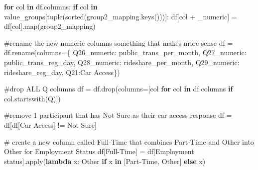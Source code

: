 \documentclass[
  letterpaper,
  DIV=11,
  numbers=noendperiod]{scrartcl}
\newenvironment{Shaded}{\begin{snugshade}}{\end{snugshade}}
\newcommand{\BuiltInTok}[1]{\textcolor[rgb]{0.00,0.23,0.31}{#1}}
\newcommand{\CommentTok}[1]{\textcolor[rgb]{0.37,0.37,0.37}{#1}}
\newcommand{\ControlFlowTok}[1]{\textcolor[rgb]{0.00,0.23,0.31}{\textbf{#1}}}
\newcommand{\KeywordTok}[1]{\textcolor[rgb]{0.00,0.23,0.31}{\textbf{#1}}}
\newcommand{\NormalTok}[1]{\textcolor[rgb]{0.00,0.23,0.31}{#1}}
\newcommand{\OperatorTok}[1]{\textcolor[rgb]{0.37,0.37,0.37}{#1}}
\newcommand{\StringTok}[1]{\textcolor[rgb]{0.13,0.47,0.30}{#1}}
\begin{document}
\begin{Shaded}
\begin{Highlighting}[]
\ControlFlowTok{for}\NormalTok{ col }\KeywordTok{in}\NormalTok{ df.columns:}
    \ControlFlowTok{if}\NormalTok{ col }\KeywordTok{in}\NormalTok{ value\_groups[}\BuiltInTok{tuple}\NormalTok{(}\BuiltInTok{sorted}\NormalTok{(group2\_mapping.keys()))]:}
\NormalTok{        df[col }\OperatorTok{+} \StringTok{\textquotesingle{}\_numeric\textquotesingle{}}\NormalTok{] }\OperatorTok{=}\NormalTok{ df[col].}\BuiltInTok{map}\NormalTok{(group2\_mapping)}

\CommentTok{\#rename the new numeric columns something that makes more sense}
\NormalTok{df }\OperatorTok{=}\NormalTok{ df.rename(columns}\OperatorTok{=}\NormalTok{\{}
  \StringTok{\textquotesingle{}Q26\_numeric\textquotesingle{}}\NormalTok{: }\StringTok{\textquotesingle{}public\_trans\_per\_month\textquotesingle{}}\NormalTok{, }
  \StringTok{\textquotesingle{}Q27\_numeric\textquotesingle{}}\NormalTok{: }\StringTok{\textquotesingle{}public\_trans\_reg\_day\textquotesingle{}}\NormalTok{, }
  \StringTok{\textquotesingle{}Q28\_numeric\textquotesingle{}}\NormalTok{: }\StringTok{\textquotesingle{}rideshare\_per\_month\textquotesingle{}}\NormalTok{, }
  \StringTok{\textquotesingle{}Q29\_numeric\textquotesingle{}}\NormalTok{: }\StringTok{\textquotesingle{}rideshare\_reg\_day\textquotesingle{}}\NormalTok{, }
  \StringTok{\textquotesingle{}Q21\textquotesingle{}}\NormalTok{:}\StringTok{\textquotesingle{}Car Access\textquotesingle{}}\NormalTok{\})}


\CommentTok{\#drop ALL Q columns}
\NormalTok{df }\OperatorTok{=}\NormalTok{ df.drop(columns}\OperatorTok{=}\NormalTok{[col }\ControlFlowTok{for}\NormalTok{ col }\KeywordTok{in}\NormalTok{ df.columns }\ControlFlowTok{if}\NormalTok{ col.startswith(}\StringTok{\textquotesingle{}Q\textquotesingle{}}\NormalTok{)])}

\CommentTok{\#remove 1 participant that has \textquotesingle{}Not Sure\textquotesingle{} as their car access response}
\NormalTok{df }\OperatorTok{=}\NormalTok{ df[df[}\StringTok{\textquotesingle{}Car Access\textquotesingle{}}\NormalTok{] }\OperatorTok{!=} \StringTok{\textquotesingle{}Not Sure\textquotesingle{}}\NormalTok{]}

\CommentTok{\# create a new column called Full{-}Time that combines Part{-}Time and Other into Other for Employment Status}
\NormalTok{df[}\StringTok{\textquotesingle{}Full{-}Time\textquotesingle{}}\NormalTok{] }\OperatorTok{=}\NormalTok{ df[}\StringTok{\textquotesingle{}Employment status\textquotesingle{}}\NormalTok{].}\BuiltInTok{apply}\NormalTok{(}\KeywordTok{lambda}\NormalTok{ x: }\StringTok{\textquotesingle{}Other\textquotesingle{}} \ControlFlowTok{if}\NormalTok{ x }\KeywordTok{in}\NormalTok{ [}\StringTok{\textquotesingle{}Part{-}Time\textquotesingle{}}\NormalTok{, }\StringTok{\textquotesingle{}Other\textquotesingle{}}\NormalTok{] }\ControlFlowTok{else}\NormalTok{ x)}


\end{Highlighting}
\end{Shaded}
\end{document}
